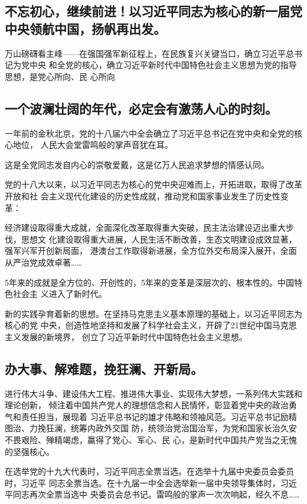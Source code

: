 \documentclass[11pt]{ctexart}
\begin{document}
{{{{\subsection{不忘初心，继续前进！以习近平同志为核心的新一届党中央领航中国，扬帆再出发。}
\label{sec:orgd6aa664}

万山磅礴看主峰——在强国强军新征程上，在民族复兴关键当口，确立习近平总书记为党中央
和全党的核心，确立习近平新时代中国特色社会主义思想为党的指导思想，是党心所向、民
心所向

\subsection{一个波澜壮阔的年代，必定会有激荡人心的时刻。}
\label{sec:orgc0bbec2}

一年前的金秋北京，党的十八届六中全会确立了习近平总书记在党中央和全党的核心地位，
人民大会堂雷鸣般的掌声音犹在耳。

这是全党同志发自内心的崇敬爱戴，这是亿万人民追求梦想的情感认同。

党的十八大以来，以习近平同志为核心的党中央迎难而上，开拓进取，取得了改革开放和社
会主义现代化建设的历史性成就，推动党和国家事业发生了历史性变革：

经济建设取得重大成就，全面深化改革取得重大突破，民主法治建设迈出重大步伐，思想文
化建设取得重大进展，人民生活不断改善，生态文明建设成效显著，强军兴军开创新局面，
港澳台工作取得新进展，全方位外交布局深入展开，全面从严治党成效卓著……

5年来的成就是全方位的、开创性的，5年来的变革是深层次的、根本性的。中国特色社会主
义进入了新时代。

新的实践孕育着新的思想。在坚持马克思主义基本原理的基础上，以习近平同志为核心的党
中央，创造性地坚持和发展了科学社会主义，开辟了21世纪中国马克思主义发展的新境界，
创立了习近平新时代中国特色社会主义思想。

\subsection{办大事、解难题，挽狂澜、开新局。}
\label{sec:org7f06e6d}

进行伟大斗争、建设伟大工程、推进伟大事业、实现伟大梦想，一系列伟大实践和理论创新，
倾注着中国共产党人的理想信念和人民情怀，彰显着党中央的政治勇气和责任担当，展现着
习近平总书记的雄才伟略和领袖风范。习近平总书记励精图治、力挽狂澜，统筹内政外交国
防，统领治党治国治军，为党和国家长治久安不畏艰险、殚精竭虑，赢得了党心、军心、民
心，是新时代中国共产党当之无愧的坚强核心。

在选举党的十九大代表时，习近平同志全票当选。在选举十九届中央委员会委员时，习近平
同志全票当选。在十九届一中全会选举新一届中央领导集体时，习近平同志再次全票当选中
央委员会总书记。雷鸣般的掌声一次次响起，经久不息……

}}}}
\end{document}
